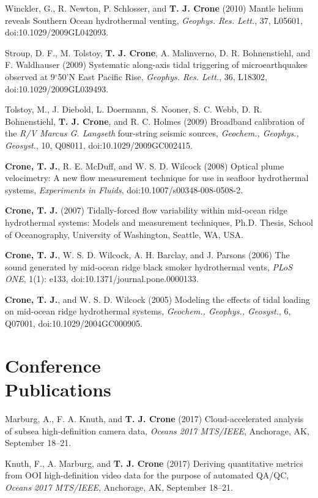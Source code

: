 \documentclass[11pt]{res}
\begin{document}
\begin{resume}
Winckler, G., R. Newton, P. Schlosser, and {\bf T. J. Crone} (2010) Mantle helium reveals Southern Ocean hydrothermal venting, {\em Geophys. Res. Lett.}, 37, L05601, doi:10.1029/2009GL042093.

Stroup, D. F., M. Tolstoy, {\bf T. J. Crone}, A. Malinverno, D. R. Bohnenstiehl, and F. Waldhauser (2009) Systematic along-axis tidal triggering of microearthquakes observed at 9$^\circ$50'N East Pacific Rise, {\em Geophys. Res. Lett.}, 36, L18302, doi:10.1029/2009GL039493.

Tolstoy, M., J. Diebold, L. Doermann, S. Nooner, S. C. Webb, D. R. Bohnenstiehl, {\bf T. J. Crone}, and R. C. Holmes (2009) Broadband calibration of the {\em R/V Marcus G. Langseth} four-string seismic sources, {\em Geochem., Geophys., Geosyst.}, 10, Q08011, doi:10.1029/2009GC002415.

{\bf Crone, T. J.}, R. E. McDuff, and W. S. D. Wilcock (2008) Optical plume velocimetry: A new flow measurement technique for use in seafloor hydrothermal systems, {\em Experiments in Fluids}, doi:10.1007/s00348-008-0508-2.

{\bf Crone, T. J.} (2007) Tidally-forced flow variability within mid-ocean ridge hydrothermal systems: Models and measurement techniques, Ph.D. Thesis, School of Oceanography, University of Washington, Seattle, WA, USA.

{\bf Crone, T. J.}, W. S. D. Wilcock, A. H. Barclay, and J. Parsons (2006) The sound generated by mid-ocean ridge black smoker hydrothermal vents, {\em PLoS ONE}, 1(1): e133, doi:10.1371/journal.pone.0000133.

{\bf Crone, T. J.}, and W. S. D. Wilcock (2005) Modeling the effects of tidal loading on mid-ocean ridge hydrothermal systems, {\em Geochem., Geophys., Geosyst.}, 6, Q07001, doi:10.1029/2004GC000905.

\section{\sc Conference\\Publications}

Marburg, A., F. A. Knuth, and {\bf T. J. Crone} (2017) Cloud-accelerated analysis of subsea high-definition camera data, \textit{Oceans 2017 MTS/IEEE}, Anchorage, AK, September 18--21.

Knuth, F., A. Marburg, and {\bf T. J. Crone} (2017) Deriving quantitative metrics from OOI high-definition video data for the purpose of automated QA/QC, \textit{Oceans 2017 MTS/IEEE}, Anchorage, AK, September 18--21.


\end{resume}
\end{document}
